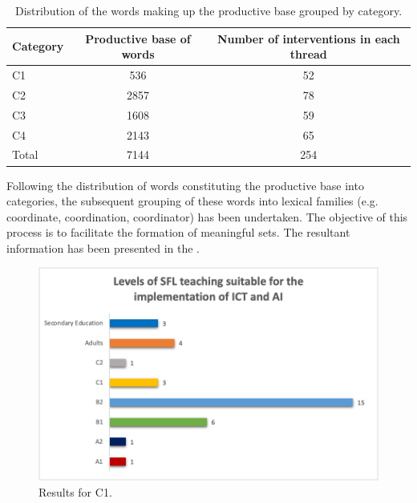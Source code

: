 \documentclass[english]{textolivre}
\begin{document}
\begin{table}[h]
\centering
\begin{threeparttable}
\caption{Distribution of the words making up the productive base grouped by category.}\label{tab-2}
\begin{tabular}{lcc}
\toprule
Category & Productive base of words & Number of interventions in each thread \\
\midrule
C1 & 536 & 52 \\
C2 & 2857 & 78 \\
C3 & 1608 & 59 \\
C4 & 2143 & 65 \\
Total & 7144 & 254 \\
\bottomrule
\end{tabular}
\end{threeparttable}
\end{table}

Following the distribution of words constituting the productive base into categories, the subsequent grouping of these words into lexical families (e.g. coordinate, coordination, coordinator) has been undertaken. The objective of this process is to facilitate the formation of meaningful sets. The resultant information has been presented in the .

\begin{figure}[h!]
    \centering
    \begin{minipage}{0.90\linewidth}
    \includegraphics[width=\linewidth]{Images/image1.png}
    \caption{Results for C1.}
    \label{fig-1}
    \end{minipage}
\end{figure}
\end{document}
